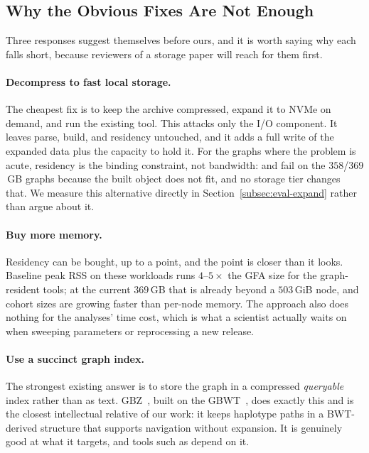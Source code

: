 \subsection{Why the Obvious Fixes Are Not Enough}
\label{subsec:bg-alternatives}

Three responses suggest themselves before ours, and it is worth saying why each
falls short, because reviewers of a storage paper will reach for them first.

\paragraph{Decompress to fast local storage.}
The cheapest fix is to keep the archive compressed, expand it to NVMe on demand,
and run the existing tool. This attacks only the I/O component. It leaves parse,
build, and residency untouched, and it adds a full write of the expanded data plus
the capacity to hold it. For the graphs where the problem is acute, residency is
the binding constraint, not bandwidth:  and  fail on the
$358$/$369$\,GB graphs because the built object does not fit, and no storage tier
changes that. We measure this alternative directly in
Section~\ref{subsec:eval-expand} rather than argue about it.

\paragraph{Buy more memory.}
Residency can be bought, up to a point, and the point is closer than it looks.
Baseline peak RSS on these workloads runs $4$--$5\times$ the GFA size for the
graph-resident tools; at the current $369$\,GB that is already beyond a
$503$\,GiB node, and cohort sizes are growing faster than per-node memory. The
approach also does nothing for the analyses' time cost, which is what a scientist
actually waits on when sweeping parameters or reprocessing a new release.

\paragraph{Use a succinct graph index.}
The strongest existing answer is to store the graph in a compressed
\emph{queryable} index rather than as text. GBZ~\cite{siren2022gbz}, built on the
GBWT~\cite{siren2020haplotype,siren2021pangenomics}, does exactly this and is the
closest intellectual relative of our work: it keeps haplotype paths in a
BWT-derived structure that supports navigation without expansion. It is genuinely
good at what it targets, and tools such as  depend on it.


